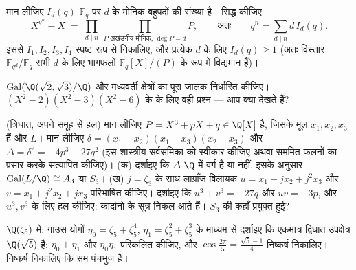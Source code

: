 \begin{exercise}[$\star\star$]\label{exo:b3:galois:6}
मान लीजिए $I_d(q)$ $\mathbb F_q$ पर  $d$ के मोनिक  बहुपदों की
संख्या है। सिद्ध कीजिए
\[
X^{q^n} - X \;=\; \prod_{d \mid n}\ \prod_{P \text{ अखंडनीय
मोनिक, } \deg P = d} P ,
\qquad\text{अतः}\qquad
q^n = \sum_{d \mid n} d\, I_d(q).
\]
इससे $I_1, I_2, I_3, I_4$ स्पष्ट रूप से निकालिए, और प्रत्येक $d$ के लिए
$I_d(q) \geq 1$ (अतः विस्तार $\mathbb F_{q^d}/\mathbb F_q$ सभी $d$ के लिए भागफलों $\mathbb F_q[X]/(P)$ के रूप
में विद्यमान हैं)।
\end{exercise}

\begin{exercise}[$\star\star$]\label{exo:b3:galois:7}
$\operatorname{Gal}(\Q(\sqrt2,\sqrt3)/\Q)$ और मध्यवर्ती क्षेत्रों का पूरा जालक निर्धारित कीजिए।
$(X^2-2)(X^2-3)(X^2-6)$ के  के लिए वही प्रश्न --- आप क्या देखते हैं?
\end{exercise}

\begin{exercise}[$\star\star$]\label{exo:b3:galois:8}
(त्रिघात, अपने समूह से हल) मान लीजिए $P = X^3 + pX + q \in
\Q[X]$  है, जिसके मूल
$x_1, x_2, x_3$ हैं और  $L$। मान लीजिए $\delta = (x_1 - x_2)(x_1 - x_3)(x_2 - x_3)$ और $\Delta = \delta^2 = -4p^3 - 27q^2$
(इस शास्त्रीय सर्वसमिका को स्वीकार कीजिए अथवा सममित फलनों का
प्रसार करके सत्यापित कीजिए)।
(क) दर्शाइए कि $\Delta$ $\Q$ में वर्ग है या नहीं, इसके अनुसार
$\operatorname{Gal}(L/\Q) \cong A_3$ या $S_3$।
(ख) $j = \zeta_3$ के साथ लाग्राँज विलायक $u = x_1
+ jx_2 + j^2x_3$ और $v = x_1 + j^2x_2 + jx_3$ परिभाषित कीजिए।
दर्शाइए कि $u^3 + v^3
= -27q$ और $uv = -3p$, और $u^3, v^3$ के लिए हल कीजिए: कार्दानो के
सूत्र निकल आते हैं। $S_3$ की  कहाँ प्रयुक्त हुई?
\end{exercise}

\begin{exercise}[$\star\star$]\label{exo:b3:galois:9}
$\Q(\zeta_5)$ में: गाउस योगों $\eta_0 = \zeta_5 + \zeta_5^4$, $\eta_1 = \zeta_5^2 + \zeta_5^3$ के माध्यम से दर्शाइए कि
एकमात्र द्विघात उपक्षेत्र $\Q(\sqrt5)$ है: $\eta_0 + \eta_1$ और $\eta_0\eta_1$ परिकलित
कीजिए, और $\cos\frac{2\pi}5 = \frac{\sqrt5 -
1}4$ निष्कर्ष निकालिए। निष्कर्ष निकालिए कि सम पंचभुज
 है।
\end{exercise}

